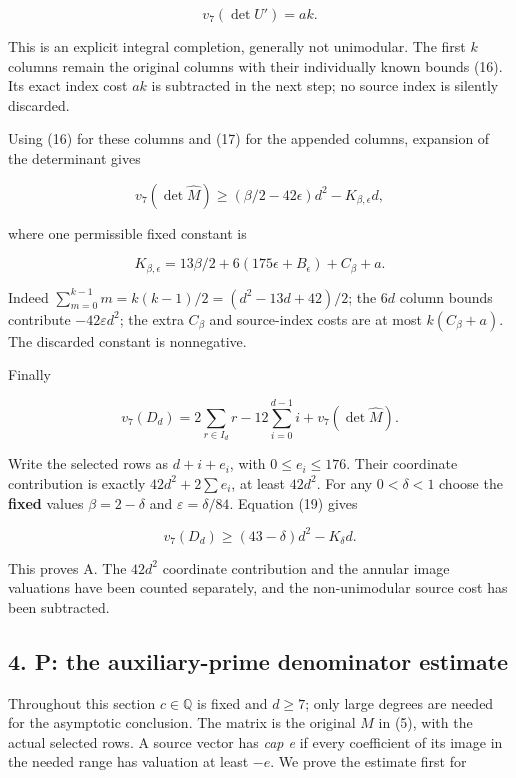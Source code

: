 \documentclass[11pt,a4paper]{article}
\begin{document}
\[
v_7(\det U')=ak.\tag{18}
\]

This is an explicit integral completion, generally not unimodular. The first \(k\) columns remain the original columns with their individually known bounds (16). Its exact index cost \(ak\) is subtracted in the next step; no source index is silently discarded.

Using (16) for these columns and (17) for the appended columns, expansion of the determinant gives

\[
v_7(\det\widehat M)
\ge(\beta/2-42\epsilon)d^2-K_{\beta,\epsilon}d,\tag{19}
\]

where one permissible fixed constant is

\[
K_{\beta,\epsilon}
=13\beta/2+6(175\epsilon+B_\epsilon)+C_\beta+a.
\]

Indeed \(\sum _{m=0}^{k-1}m=k(k-1)/2=(d^{2}-13d+42)/2\); the \(6d\) column bounds contribute \(-42εd^{2}\); the extra \(C_β\) and source-index costs are at most \(k(C_β+a)\). The discarded constant is nonnegative.

Finally

\[
v_7(D_d)=2\sum_{r\in I_d}r-12\sum_{i=0}^{d-1}i+v_7(\det\widehat M).
\]

Write the selected rows as \(d+i+e_i\), with \(0≤e_i≤176\). Their coordinate contribution is exactly \(42d^{2}+2\sum e_i\), at least \(42d^{2}\). For any \(0<δ<1\) choose the \textbf{fixed} values \(β=2-δ\) and \(ε=δ/84\). Equation (19) gives

\[
v_7(D_d)\ge(43-\delta)d^2-K_\delta d.\tag{A}
\]

This proves A. The \(42d^{2}\) coordinate contribution and the annular image valuations have been counted separately, and the non-unimodular source cost has been subtracted.

\hypertarget{p-the-auxiliary-prime-denominator-estimate}{%
\subsection{4. P: the auxiliary-prime denominator estimate}\label{p-the-auxiliary-prime-denominator-estimate}}

Throughout this section \(c∈\mathbb{Q}\) is fixed and \(d≥7\); only large degrees are needed for the asymptotic conclusion. The matrix is the original \(M\) in (5), with the actual selected rows. A source vector has \emph{cap e} if every coefficient of its image in the needed range has valuation at least \(-e\). We prove the estimate first for
\end{document}
